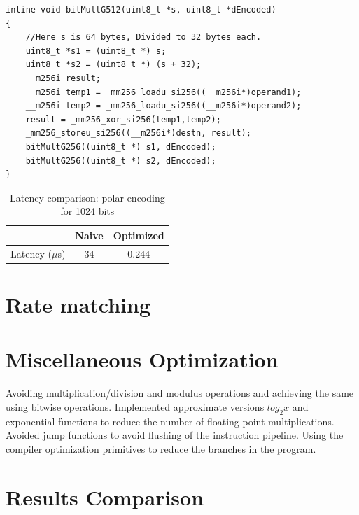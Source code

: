 \begin{verbatim}
inline void bitMultG512(uint8_t *s, uint8_t *dEncoded) 
{
	//Here s is 64 bytes, Divided to 32 bytes each.
	uint8_t *s1 = (uint8_t *) s;
	uint8_t *s2 = (uint8_t *) (s + 32);
	__m256i result;
	__m256i temp1 = _mm256_loadu_si256((__m256i*)operand1);
	__m256i temp2 = _mm256_loadu_si256((__m256i*)operand2);
	result = _mm256_xor_si256(temp1,temp2);
	_mm256_storeu_si256((__m256i*)destn, result);
	bitMultG256((uint8_t *) s1, dEncoded);
	bitMultG256((uint8_t *) s2, dEncoded);
}
\end{verbatim}

\begin{table}[!h]
	\begin{center}
		\caption{Latency comparison: polar encoding for 1024 bits}
		\label{tab:polarEncoder}
		\begin{tabular}{c|c|c} %
			\textbf{ } & Naive & Optimized \\
			\hline
			Latency ($\mu$s) & $34$ & $0.244$\\
		\end{tabular}
	\end{center}
\end{table}

\section{Rate matching}

\section{Miscellaneous Optimization}
Avoiding multiplication/division and modulus operations and achieving the same using bitwise operations.
Implemented approximate versions $log_{2}x$ and exponential functions to reduce the number of floating point multiplications.
Avoided jump functions to avoid flushing of the instruction pipeline.
Using the compiler optimization primitives to reduce the branches in the program.

\section{Results Comparison}

